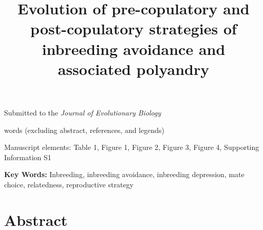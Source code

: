 \documentclass[12pt]{article}
\title{Evolution of pre-copulatory and post-copulatory strategies of inbreeding avoidance and associated polyandry}
\date{}
\begin{document}
\maketitle

\begin{center}
\vspace{5 mm}


\vspace{5 mm}


\vspace{15 mm}

\noindent Submitted to the \emph{Journal of Evolutionary Biology}  

\vspace{15 mm} 

 words (excluding abstract, references, and legends)

\vspace{15 mm} 

\noindent Manuscript elements: Table 1, Figure 1, Figure 2, Figure 3, Figure 4, Supporting Information S1 

\vspace{15 mm}

\noindent \textbf{Key Words:} Inbreeding, inbreeding avoidance, inbreeding depression, mate choice, relatedness, reproductive strategy
\newline

\end{center}

\linenumbers
\modulolinenumbers[2]
\onehalfspacing

\clearpage

\section*{Abstract} 
\end{document}
